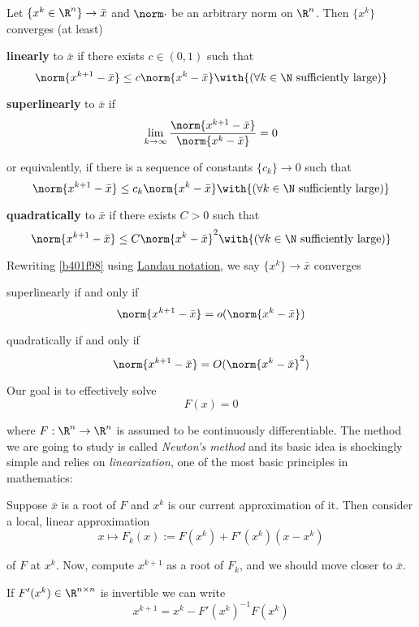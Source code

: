 Let $\{x^k\in\R^n\}\to\bar x$ and $\norm\cdot$ be an arbitrary norm on $\R^n$.
Then $\{x^k\}$ converges (at least)
\begin{enumerati}
  \def\X{\norm{x^{k+1}-\bar x}}\def\x{\norm{x^{k}-\bar x}}
  \item \textbf{linearly} to $\bar x$ if there exists $c\in(0,1)$ such that
  $$
    \X\leq c\x\with{(\forall k\in\N\text{ sufficiently large})}
  $$
  \item \textbf{superlinearly} to $\bar x$ if
  $$
    \lim_{k\to\infty}\frac\X\x=0
  $$

  or equivalently, if there is a sequence of constants $\{c_k\}\to0$ such that
  $$
    \X\leq c_k\x\with{(\forall k\in\N\text{ sufficiently large})}
  $$
  \item \textbf{quadratically} to $\bar x$ if there exists $C>0$ such that
  $$
    \X\leq C\x^2\with{(\forall k\in\N\text{ sufficiently large})}
  $$
\end{enumerati}

\label{e32ba11}

Rewriting \autoref{b401f98} using \href{ab54b3a}{Landau notation}, we say
$\{x^k\}\to\bar x$ converges
\begin{enumerati}
  \item superlinearly if and only if
  $$
    \norm{x^{k+1}-\bar x}=o(\norm{x^{k}-\bar x})
  $$
  \item quadratically if and only if
  $$
    \norm{x^{k+1}-\bar x}=O(\norm{x^{k}-\bar x}^2)
  $$
\end{enumerati}

\label{d6c0554}

Our goal is to effectively solve
$$
  F(x)=0
$$

where $F:\R^n\to\R^n$ is assumed to be continuously differentiable. The method
we are going to study is called \textit{Newton's method} and its basic idea is
shockingly simple and relies on \textit{linearization}, one of the most basic
principles in mathematics:

Suppose $\bar x$ is a root of $F$ and $x^k$ is our current approximation of it.
Then consider a local, linear approximation
$$
  x\mapsto F_k(x):=F(x^k)+F'(x^k)(x-x^k)
$$

of $F$ at $x^k$. Now, compute $x^{k+1}$ as a root of $F_k$, and we should move
closer to $\bar x$.

If $F'(x^k)\in\R^{n\times n}$ is invertible we can write
$$
  x^{k+1}=x^k-F'(x^k)^{-1}F(x^k)
$$

